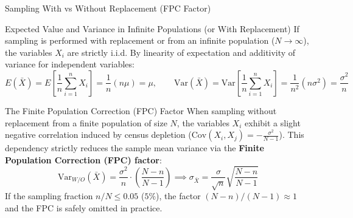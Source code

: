 \documentclass[10pt, aspectratio=169]{beamer}
\begin{document}
\begin{frame}{Sampling With vs Without Replacement (FPC Factor)}
  \fontsize{7.5pt}{9pt}\selectfont
  \begin{block}{Expected Value and Variance in Infinite Populations (or With Replacement)}
    \fontsize{7.5pt}{9pt}\selectfont
    If sampling is performed with replacement or from an infinite population ($N \to \infty$), the variables $X_i$ are strictly i.i.d. By linearity of expectation and additivity of variance for independent variables:
    $$E(\bar{X}) = E\left[\frac{1}{n}\sum_{i=1}^n X_i\right] = \frac{1}{n}(n\mu) = \mu, \qquad \text{Var}(\bar{X}) = \text{Var}\left[\frac{1}{n}\sum_{i=1}^n X_i\right] = \frac{1}{n^2}(n\sigma^2) = \frac{\sigma^2}{n}$$
  \end{block}
  \vspace{-0.15cm}
  \pause
  \begin{alertblock}{The Finite Population Correction (FPC) Factor}
    \fontsize{7.5pt}{9pt}\selectfont
    When sampling without replacement from a finite population of size $N$, the variables $X_i$ exhibit a slight negative correlation induced by census depletion ($\text{Cov}(X_i, X_j) = -\frac{\sigma^2}{N-1}$). This dependency strictly reduces the sample mean variance via the \textbf{Finite Population Correction (FPC) factor}:
    $$\text{Var}_{W/O}(\bar{X}) = \frac{\sigma^2}{n} \cdot \left(\frac{N-n}{N-1}\right) \implies \sigma_{\bar{X}} = \frac{\sigma}{\sqrt{n}} \sqrt{\frac{N-n}{N-1}}$$
    If the sampling fraction $n/N \le 0.05$ ($5\%$), the factor $(N-n)/(N-1) \approx 1$ and the FPC is safely omitted in practice.
  \end{alertblock}
\end{frame}
\end{document}
